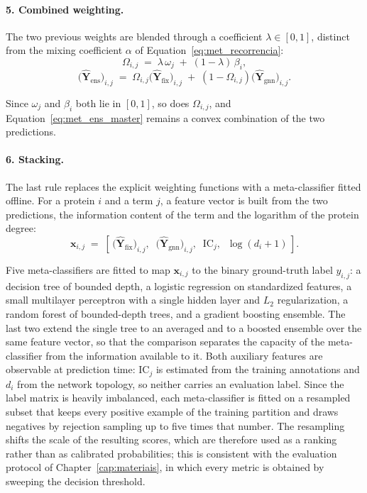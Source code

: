 \documentclass[Ingles]{ic-tese-v3}
\begin{document}
\paragraph{5. Combined weighting.} The two previous weights are blended through a coefficient
$\lambda \in [0,1]$, distinct from the mixing coefficient $\alpha$ of
Equation~\eqref{eq:met_recorrencia}:
\begin{equation}
  \Omega_{i,j} \;=\; \lambda\, \omega_j \;+\; (1 - \lambda)\, \beta_i,
  \label{eq:met_ens_w}
\end{equation}
\begin{equation}
  \bigl(\hat{\mathbf{Y}}_{\text{ens}}\bigr)_{i,j} \;=\;
  \Omega_{i,j} \bigl(\hat{\mathbf{Y}}_{\text{fix}}\bigr)_{i,j}
  \;+\; (1 - \Omega_{i,j}) \bigl(\hat{\mathbf{Y}}_{\text{gnn}}\bigr)_{i,j}.
  \label{eq:met_ens_master}
\end{equation}

Since $\omega_j$ and $\beta_i$ both lie in $[0,1]$, so does $\Omega_{i,j}$, and
Equation~\eqref{eq:met_ens_master} remains a convex combination of the two predictions.

\paragraph{6. Stacking.} The last rule replaces the explicit weighting functions with a
meta-classifier fitted offline. For a protein $i$ and a term $j$, a feature vector is built from the
two predictions, the information content of the term and the logarithm of the protein degree:
\begin{equation}
  \mathbf{x}_{i,j} \;=\;
  \left[\, \bigl(\hat{\mathbf{Y}}_{\text{fix}}\bigr)_{i,j} ,\;\;
           \bigl(\hat{\mathbf{Y}}_{\text{gnn}}\bigr)_{i,j} ,\;\;
           \mathrm{IC}_j ,\;\;
           \log(d_i + 1) \,\right].
  \label{eq:met_ens_stack}
\end{equation}

Five meta-classifiers are fitted to map $\mathbf{x}_{i,j}$ to the binary ground-truth label
$y_{i,j}$: a decision tree of bounded depth, a logistic regression on standardized features, a
small multilayer perceptron with a single hidden layer and $L_2$ regularization, a random forest of
bounded-depth trees, and a gradient boosting ensemble. The last two extend the single tree to an
averaged and to a boosted ensemble over the same feature vector, so that the comparison separates
the capacity of the meta-classifier from the information available to it. Both auxiliary
features are observable at prediction time: $\mathrm{IC}_j$ is estimated from the training
annotations and $d_i$ from the network topology, so neither carries an evaluation label. Since the
label matrix is heavily imbalanced, each meta-classifier is fitted on a resampled subset that keeps
every positive example of the training partition and draws negatives by rejection sampling up to
five times that number. The resampling shifts
the scale of the resulting scores, which are therefore used as a ranking rather than as calibrated
probabilities; this is consistent with the evaluation protocol of Chapter~\ref{cap:materiais}, in
which every metric is obtained by sweeping the decision threshold.
\end{document}
